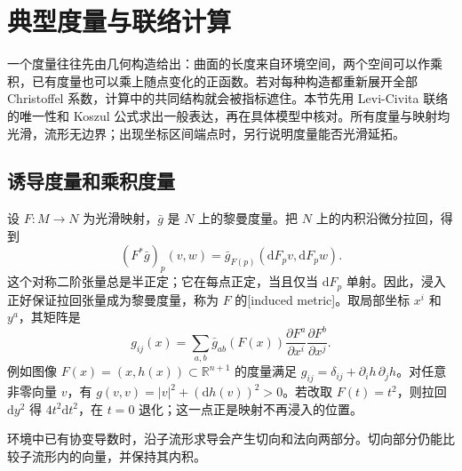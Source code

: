 
% 
% 
% 

\section{典型度量与联络计算}
\label{g3:sec:0104}

一个度量往往先由几何构造给出：曲面的长度来自环境空间，两个空间可以作乘积，已有度量也可以乘上随点变化的正函数。若对每种构造都重新展开全部 Christoffel 系数，计算中的共同结构就会被指标遮住。本节先用 Levi-Civita 联络的唯一性和 Koszul 公式求出一般表达，再在具体模型中核对。所有度量与映射均光滑，流形无边界；出现坐标区间端点时，另行说明度量能否光滑延拓。

\subsection{诱导度量和乘积度量}
\label{g3:subsec:0104:01}
设 \(F:M\rightarrow N\) 为光滑映射，\(\bar g\) 是 \(N\) 上的黎曼度量。把 \(N\) 上的内积沿微分拉回，得到
\[
	(F^*\bar g)_p(v,w)=\bar g_{F(p)}(\mathrm dF_pv,\mathrm dF_pw).
\]
这个对称二阶张量总是半正定；它在每点正定，当且仅当 \(\mathrm dF_p\) 单射。因此，浸入正好保证拉回张量成为黎曼度量，称为 \(F\) 的[induced metric]。取局部坐标 \(x^i\) 和 \(y^a\)，其矩阵是
\begin{equation}\label{g3:eq:induced-metric-coordinates}
	g_{ij}(x)=\sum_{a,b}\bar g_{ab}(F(x))
	\frac{\partial F^a}{\partial x^i}\frac{\partial F^b}{\partial x^j}.
\end{equation}
例如图像 \(F(x)=(x,h(x))\subset\mathbb R^{n+1}\) 的度量满足 \(g_{ij}=\delta_{ij}+\partial_i h\,\partial_j h\)。对任意非零向量 \(v\)，有 \(g(v,v)=|v|^2+(\mathrm dh(v))^2>0\)。若改取 \(F(t)=t^2\)，则拉回 \(\mathrm dy^2\) 得 \(4t^2\mathrm dt^2\)，在 \(t=0\) 退化；这一点正是映射不再浸入的位置。

\ProseParagraphBreak

环境中已有协变导数时，沿子流形求导会产生切向和法向两部分。切向部分仍能比较子流形内的向量，并保持其内积。

